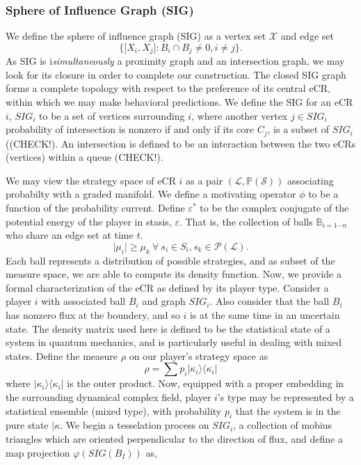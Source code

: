 \documentclass[10pt]{article}
\newcommand{\mcL}{\mathcal{L}}
\newcommand{\mcP}{\mathcal{P}}
\newcommand{\mcX}{\mathcal{X}}
\newcommand{\mcS}{\mathcal{S}}
\theoremstyle{definition}
\begin{document}
\subsubsection{Sphere of Influence Graph (SIG)}
 We define the sphere of influence graph
(SIG) as a vertex set $\mcX$ and edge set 
$$
\lbrace\lbrack X_i, X_j\rbrack : B_i \cap B_j \ne 0, i\ne j\rbrace.
$$
As SIG is i\emph{simultaneously} a proximity graph and an intersection graph, we
may look for its closure in order to complete our construction. The closed SIG
graph forms a complete topology with respect to the preference of its central
eCR, within which we may make behavioral predictions. We define the SIG for an
eCR $i$, $SIG_i$ to be a set of vertices surrounding $i$, where another vertex
$j\in SIG_i$ probability of intersection is nonzero if and only if its core
$C_j$, is a subset of $SIG_i$ ((CHECK!). An intersection is defined to
be an interaction between the two eCRs (vertices) within a queue (CHECK!).

We may view the strategy space of eCR $i$ as a pair $(\mcL, \mathbb{P}(\mcS))$
associating probabilty with a graded manifold. We define a motivating operator $\phi$ to be a
function of the probability current. Define $\varepsilon^*$ to be the complex
conjugate of the potential energy of the player in stasis, $\varepsilon$.
That is, the
collection of balls $\mathbb{B}_{i=1\cdots n}$ who share an edge set at time $t$.
$$
\vert \mu_i \vert \ge \mu_k \ \forall \ s_i \in S_i, s_k \in \mcP(\mcL).
$$
Each ball represents a distribution of possible strategies, and as subset of the
measure space, we are able to compute its density function. Now, we provide a
formal characterization of the eCR as defined by its player type. Consider a
player $i$ with associated ball $B_i$ and graph $SIG_i$. Also consider that the ball $B_i$ has nonzero flux
at the boundery, and so $i$ is at the same time in an uncertain state. The
density matrix used here is defined to be the statistical state of a system in
quantum mechanics, and is particularly useful in dealing with mixed states. Define the measure $\rho$ on our player's strategy space as
$$
\rho = \displaystyle\sum p_i\vert\kappa_i\rangle\langle\kappa_i\vert
$$
where $\vert\kappa_i\rangle\langle\kappa_i\vert$ is the outer product. Now,
equipped with a proper embedding in the surrounding
dynamical complex field, player $i$'s type may be represented by a statistical
ensemble (mixed type), with probability $p_i$ that the system is in the pure
state $\vert \kappa$. We begin a tesselation process on $SIG_i$, a collection of
mobius triangles which are oriented perpendicular to the direction of flux, and
define a map projection $\varphi(SIG(B_I))$ as,
\end{document}
